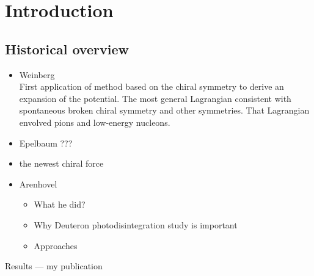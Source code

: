\chapter{Introduction}
\label{introduction}

\section{Historical overview}

\begin{itemize}
    \item Weinberg \cite{WEINBERG1990}\\
        First application of method based on the chiral symmetry
        to derive an expansion of the potential. The most general Lagrangian
        consistent with spontaneous broken chiral symmetry and other symmetries.
        That Lagrangian envolved pions and low-energy nucleons. 
    \item Epelbaum ???
    \item the newest chiral force \cite{reinkrebs2018} 
    \item Arenhovel \cite{ArenhovelPhotodisint1991}
    \begin{itemize}
        \item What he did?
        \item Why Deuteron photodisintegration study is important
        \item Approaches
    \end{itemize}
\end{itemize}

Results — my publication \cite{UrbanevychPhysRevC2021}